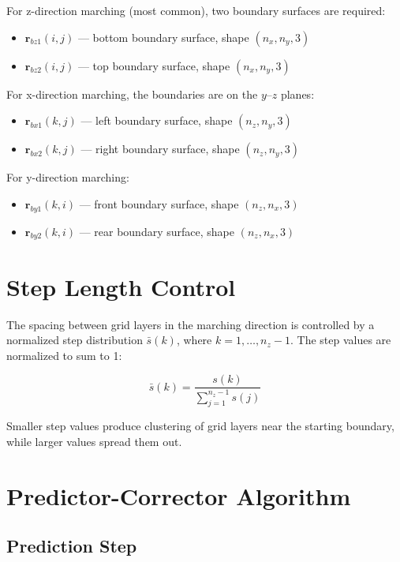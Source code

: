 \documentclass[11pt,a4paper]{report}
\newcommand{\rvec}{\bm{r}}
\begin{document}
For z-direction marching (most common), two boundary surfaces are required:
\begin{itemize}
    \item $\rvec_{bz1}(i,j)$ --- bottom boundary surface, shape $(n_x, n_y, 3)$
    \item $\rvec_{bz2}(i,j)$ --- top boundary surface, shape $(n_x, n_y, 3)$
\end{itemize}

For x-direction marching, the boundaries are on the $y$--$z$ planes:
\begin{itemize}
    \item $\rvec_{bx1}(k,j)$ --- left boundary surface, shape $(n_z, n_y, 3)$
    \item $\rvec_{bx2}(k,j)$ --- right boundary surface, shape $(n_z, n_y, 3)$
\end{itemize}

For y-direction marching:
\begin{itemize}
    \item $\rvec_{by1}(k,i)$ --- front boundary surface, shape $(n_z, n_x, 3)$
    \item $\rvec_{by2}(k,i)$ --- rear boundary surface, shape $(n_z, n_x, 3)$
\end{itemize}

\section{Step Length Control}

The spacing between grid layers in the marching direction is controlled by a normalized step distribution $\bar{s}(k)$, where $k = 1, \dots, n_z-1$. The step values are normalized to sum to 1:

\begin{equation}
    \bar{s}(k) = \frac{s(k)}{\sum_{j=1}^{n_z-1} s(j)}
\end{equation}

Smaller step values produce clustering of grid layers near the starting boundary, while larger values spread them out.

\section{Predictor-Corrector Algorithm}

\subsection{Prediction Step}
\end{document}
